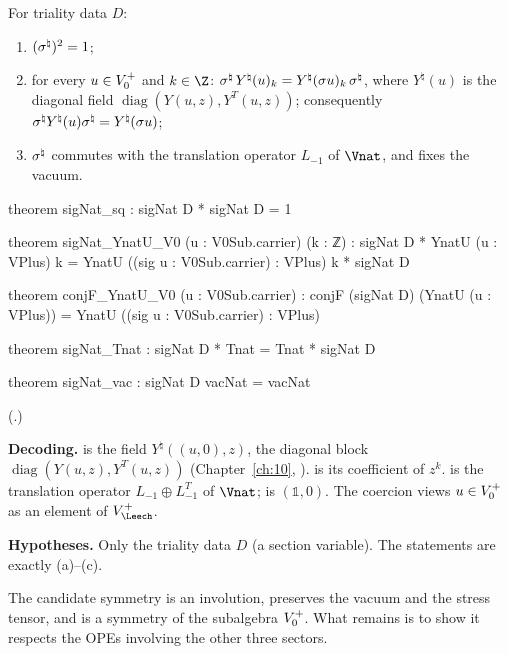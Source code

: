 \begin{theorem}\label{ch14:thm:signat}
For triality data $D$:
\begin{enumerate}[label=(\alph*)]
\item $(\sigma^{\natural})^2=1$;
\item for every $u\in V_0^{+}$ and $k\in\Z$: $\sigma^{\natural}\,Y^\natural(u)_k=Y^\natural(\sigma u)_k\,\sigma^{\natural}$,
  where $Y^\natural(u)$ is the diagonal field $\operatorname{diag}(Y(u,z),Y^T(u,z))$;
  consequently $\sigma^{\natural} Y^\natural(u)\sigma^{\natural}=Y^\natural(\sigma u)$;
\item $\sigma^{\natural}$ commutes with the translation operator $L_{-1}$ of $\Vnat$, and fixes the vacuum.
\end{enumerate}
\end{theorem}
\begin{leancode}
theorem sigNat_sq : sigNat D * sigNat D = 1

theorem sigNat_YnatU_V0 (u : V0Sub.carrier) (k : ℤ) :
    sigNat D * YnatU (u : VPlus) k = YnatU ((sig u : V0Sub.carrier) : VPlus) k * sigNat D

theorem conjF_YnatU_V0 (u : V0Sub.carrier) :
    conjF (sigNat D) (YnatU (u : VPlus)) = YnatU ((sig u : V0Sub.carrier) : VPlus)

theorem sigNat_Tnat : sigNat D * Tnat = Tnat * sigNat D

theorem sigNat_vac : sigNat D vacNat = vacNat
\end{leancode}
(.)

\begin{dictionary}
\textbf{Decoding.}   is the field $Y^\natural((u,0),z)$, the diagonal block
$\operatorname{diag}(Y(u,z),Y^T(u,z))$ (Chapter~\ref{ch:10}, ).  
is its coefficient of $z^k$.   is the translation operator $L_{-1}\oplus L_{-1}^T$ of $\Vnat$;
 is $(\mathbb 1,0)$.  The coercion  views $u\in V_0^{+}$ as an element of
$V_\Leech^+$.

\textbf{Hypotheses.}  Only the triality data $D$ (a section variable).  The statements are exactly
(a)--(c).
\end{dictionary}
\begin{physics}
The candidate symmetry is an involution, preserves the vacuum and the stress tensor, and is a symmetry of the subalgebra $V_0^{+}$. What remains is to show it respects the OPEs involving the other three sectors.
\end{physics}


